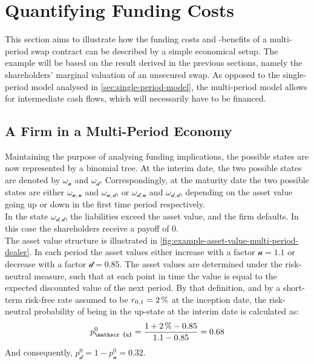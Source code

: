 \documentclass[main.tex]{subfiles}
\begin{document}
    \section{Quantifying Funding Costs}

        This section aims to illustrate
        how the funding costs and -benefits of a multi-period swap contract
        can be described by a simple economical setup.
        The example will be based on the result derived in the previous sections,
        namely the shareholders' marginal valuation of an unsecured swap.
        As opposed to the single-period model analysed in \cref{sec:single-period-model},
        the multi-period model allows for intermediate cash flows,
        which will necessarily have to be financed.

    \subsection{A Firm in a Multi-Period Economy}
    \label{sec:swap-examples}
        
        Maintaining the purpose of analysing funding implications,
        the possible states are now represented by a binomial tree.
        At the interim date, the two possible states are denoted by $\omega_\mathscr{u}$ and $\omega_\mathscr{d}$.
        Correspondingly, at the maturity date the two possible states are either
        $\omega_{\mathscr{u},\mathscr{u}}$ and $\omega_{\mathscr{u},\mathscr{d}}$,
        or $\omega_{\mathscr{d},\mathscr{u}}$ and $\omega_{\mathscr{d},\mathscr{d}}$,
        depending on the asset value going up or down in the first time period respectively.
        \\
        In the state $\omega_{\mathscr{d},\mathscr{d}}$, the liabilities exceed the asset value,
        and the firm defaults.
        In this case the shareholders receive a payoff of 0.
        \\
        The asset value structure is illustrated in 
        \cref{fig:example-asset-value-multi-period-dealer}.
        In each period the asset values either increase with a factor $\mathscr{u} = \num{1.1}$
        or decrease with a factor $\mathscr{d} = \num{0.85}$.
        The asset values are determined under the risk-neutral measure,
        such that at each point in time the value is equal to the expected discounted value of the next period.
        By that definition, and by a short-term risk-free rate assumed to be $r_{0,1}=\pct{0.02}$ at the inception date,
        the risk-neutral probability of being in the up-state at the interim date is calculated as:
        \begin{equation*}
            p_{\mathscr{u}}^{0} =
            \frac{
                \num{1} + \pct{0.02} - \num{0.85}
            }{
                \num{1.1} - \num{0.85}
            }
            = \num{0.68}
        \end{equation*}
        And consequently, $p_{\mathscr{d}}^{0} = 1 - p_{\mathscr{u}}^{0} = \num{0.32}$.
\end{document}
